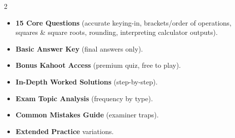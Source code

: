 \documentclass[11pt,a4paper]{article}
\newcommand{\FullReleaseDate}{April 30, 2026}
\begin{document}
\vspace{8pt}

\begin{multicols}{2}
  \begin{tcolorbox}[card, title=\sffamily\bfseries\textcolor{white}{\faHandPointDown\ TODAY (Simplified Version)}, colbacktitle=mainblue, boxed title style={sharp corners, boxrule=0pt}]
    \begin{itemize}[leftmargin=1.2em, itemsep=2pt]
      \item \small \textbf{15 Core Questions} (accurate keying-in, brackets/order of operations, squares \& square roots, rounding, interpreting calculator outputs).
      \item \small \textbf{Basic Answer Key} (final answers only).
      \item \small \textbf{Bonus Kahoot Access} (premium quiz, free to play).
    \end{itemize}
  \end{tcolorbox}

  \columnbreak

  \begin{tcolorbox}[card, title=\sffamily\bfseries\textcolor{white}{\faRocket\ ON \FullReleaseDate\ (Full Upgrade)}, colbacktitle=mainblue, boxed title style={sharp corners, boxrule=0pt}]
    \begin{itemize}[leftmargin=1.2em, itemsep=2pt]
      \item \small \textbf{In-Depth Worked Solutions} (step-by-step).
      \item \small \textbf{Exam Topic Analysis} (frequency by type).
      \item \small \textbf{Common Mistakes Guide} (examiner traps).
      \item \small \textbf{Extended Practice} variations.
    \end{itemize}
  \end{tcolorbox}
\end{multicols}
\end{document}
